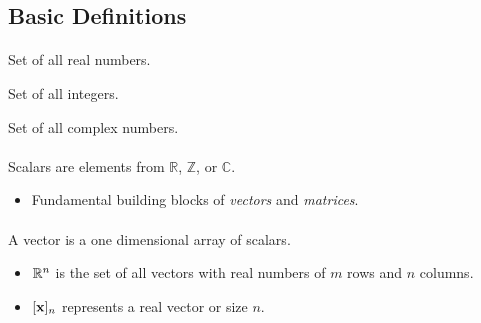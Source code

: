 \documentclass[../main.tex]{subfiles}
\begin{document}
\subsection{Basic Definitions}
\noindent

\paragraph{ }
 Set of all real numbers. 

 Set of all integers. 

 Set of all complex numbers. 

\paragraph{ }
\keyword{\textcolor{blue}{Scalars}}
Scalars are elements from $\mathbb{R}$, $\mathbb{Z}$, or $\mathbb{C}$.
\begin{itemize}
  \item Fundamental building blocks of \textit{vectors} and \textit{matrices}.
\end{itemize}
\paragraph{ }
\keyword{\textcolor{blue}{Vectors}} 
A vector is a one dimensional array of scalars. 
\begin{itemize}
  \item $\mathbb{R}^n$ is the set of all vectors with real numbers of $m$ rows and $n$ columns.
  \item $[\mathbf{x}]_{n}$ represents a real vector or size $n$.
\end{itemize}
\end{document}
